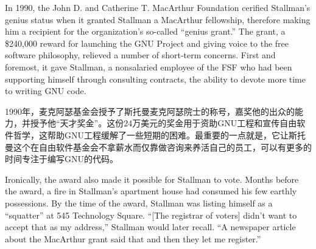 \ifdefined\eng
In 1990, the John D. and Catherine T. MacArthur Foundation cerified Stallman's genius status when it granted Stallman a MacArthur fellowship, therefore making him a recipient for the organization's so-called ``genius grant.'' The grant, a \$240,000 reward for launching the GNU Project and giving voice to the free software philosophy, relieved a number of short-term concerns. First and foremost, it gave Stallman, a nonsalaried employee of the FSF who had been supporting himself through consulting contracts, the ability to devote more time to writing GNU code.
\fi

\ifdefined\chs
1990年，麦克阿瑟基金会授予了斯托曼麦克阿瑟院士的称号，嘉奖他的出众的能力，并授予他``天才奖金''。这份24万美元的奖金用于资助GNU工程和宣传自由软件哲学，这帮助GNU工程缓解了一些短期的困难。最重要的一点就是，它让斯托曼这个在自由软件基金会不拿薪水而仅靠做咨询来养活自己的员工，可以有更多的时间专注于编写GNU的代码。
\fi

\ifdefined\eng
Ironically, the award also made it possible for Stallman to vote. Months before the award, a fire in Stallman's apartment house had consumed his few earthly possessions. By the time of the award, Stallman was listing himself as a ``squatter'' at 545 Technology Square. ``[The registrar of voters] didn't want to accept that as my address,'' Stallman would later recall. ``A newspaper article about the MacArthur grant said that and then they let me register.''
\fi

